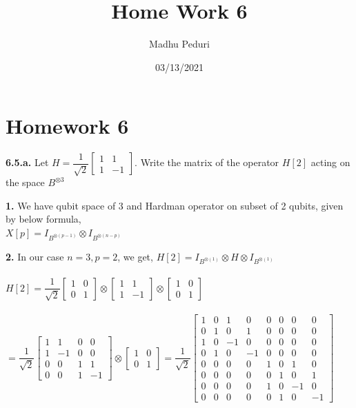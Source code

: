 \documentclass [12pt]{article}
\title{Home Work 6}
\author{Madhu Peduri}
\date{03/13/2021}
\theoremstyle{definition}
\begin{document}
\section*{Homework 6}

{\bf 6.5.a.} Let $H = \dfrac{1}{\sqrt{2}}\begin{bmatrix} 1 & 1 \\ 1 & -1 \end{bmatrix}$. Write the matrix of the operator $H[2]$ acting on the space $B^{\otimes 3}$

\phantom{1em} {\bf 1.} We have qubit space of 3 and Hardman operator on subset of 2 qubits, given by below formula,\\
\phantom{1000em} $X[p] = I_{B^{\otimes (p-1)}} \otimes I_{B^{\otimes (n-p)}}$

\phantom{1em} {\bf 2.} In our case $n=3, p=2$, we get, $H[2] = I_{B^{\otimes (1)}} \otimes H \otimes I_{B^{\otimes (1)}}$\\\\
\phantom{1000em} $H[2] = \dfrac{1}{\sqrt{2}}\begin{bmatrix} 1 & 0 \\ 0 & 1 \end{bmatrix} \otimes \begin{bmatrix} 1 & 1 \\ 1 & -1 \end{bmatrix} \otimes \begin{bmatrix} 1 & 0 \\ 0 & 1 \end{bmatrix}$\\\\
\phantom{1000em} $= \dfrac{1}{\sqrt{2}}\begin{bmatrix} 1 & 1 & 0 & 0 \\ 1 & -1 & 0 & 0 \\ 0 & 0 & 1 & 1 \\ 0 & 0 & 1 & -1\end{bmatrix} \otimes \begin{bmatrix} 1 & 0 \\ 0 & 1 \end{bmatrix} = \dfrac{1}{\sqrt{2}}\begin{bmatrix} 1 & 0 & 1 & 0 & 0 & 0 & 0 & 0\\ 0 & 1 & 0 & 1 & 0 & 0 & 0 & 0\\1 & 0 & -1 & 0 & 0 & 0 & 0 & 0\\0 & 1 & 0 & -1 & 0 & 0 & 0 & 0\\0 & 0 & 0 & 0 & 1 & 0 & 1 & 0\\0 & 0 & 0 & 0 & 0 & 1 & 0 & 1\\0 & 0 & 0 & 0 & 1 & 0 & -1 & 0\\0 & 0 & 0 & 0 & 0 & 1 & 0 & -1\end{bmatrix}$
\end{document}
